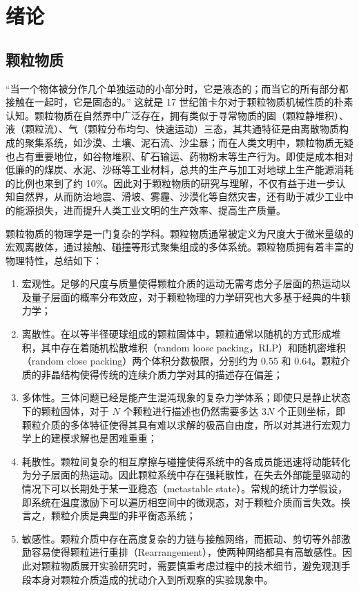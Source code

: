 
\chapter{绪论}

\section{颗粒物质}

“当一个物体被分作几个单独运动的小部分时，它是液态的；而当它的所有部分都接触在一起时，它是固态的。” 这就是 17 世纪笛卡尔对于颗粒物质机械性质的朴素认知。颗粒物质在自然界中广泛存在，拥有类似于寻常物质的固（颗粒静堆积）、液（颗粒流）、气（颗粒分布均匀、快速运动）三态\cite{RevModPhys.68.1259}，其共通特征是由离散物质构成的聚集系统，如沙漠、土壤、泥石流、沙尘暴；而在人类文明中，颗粒物质无疑也占有重要地位，如谷物堆积、矿石输运、药物粉末等生产行为。即使是成本相对低廉的的煤炭、水泥、沙砾等工业材料，总共的生产与加工对地球上生产能源消耗的比例也来到了约 \num{10}\%\cite{duran2000sands}。因此对于颗粒物质的研究与理解，不仅有益于进一步认知自然界，从而防治地震、滑坡、雾霾、沙漠化等自然灾害，还有助于减少工业中的能源损失，进而提升人类工业文明的生产效率、提高生产质量。

颗粒物质的物理学是一门复杂的学科。颗粒物质通常被定义为尺度大于微米量级的宏观离散体，通过接触、碰撞等形式聚集组成的多体系统。颗粒物质拥有着丰富的物理特性，总结如下：

\begin{enumerate}
  \item 宏观性。足够的尺度与质量使得颗粒介质的运动无需考虑分子层面的热运动以及量子层面的概率分布效应，对于颗粒物理的力学研究也大多基于经典的牛顿力学；
  \item 离散性。在以等半径硬球组成的颗粒固体中，颗粒通常以随机的方式形成堆积，其中存在着随机松散堆积（random loose packing，RLP）和随机密堆积（random close packing）两个体积分数极限，分别约为 0.55\cite{PhysRevLett.64.2727} 和 0.64\cite{RevModPhys.82.789}。颗粒介质的非晶结构使得传统的连续介质力学对其的描述存在偏差\cite{RevModPhys.71.435}；
  \item 多体性。三体问题已经是能产生混沌现象的复杂力学体系；即使只是静止状态下的颗粒固体，对于 $N$ 个颗粒进行描述也仍然需要多达 $3N$ 个正则坐标，即颗粒介质的多体特征使得其具有难以求解的极高自由度，所以对其进行宏观力学上的建模求解也是困难重重；
  \item 耗散性。颗粒间复杂的相互摩擦与碰撞使得系统中的各成员能迅速将动能转化为分子层面的热运动。因此颗粒系统中存在强耗散性，在失去外部能量驱动的情况下可以长期处于某一亚稳态（metastable state）。常规的统计力学假设，即系统在温度激励下可以遍历相空间中的微观态，对于颗粒介质而言失效。换言之，颗粒介质是典型的非平衡态系统；
  \item 敏感性。颗粒介质中存在高度复杂的力链与接触网络，而振动、剪切等外部激励容易使得颗粒进行重排（Rearrangement），使两种网络都具有高敏感性。因此对颗粒物质展开实验研究时，需要慎重考虑过程中的技术细节，避免观测手段本身对颗粒介质造成的扰动介入到所观察的实验现象中。
\end{enumerate}


